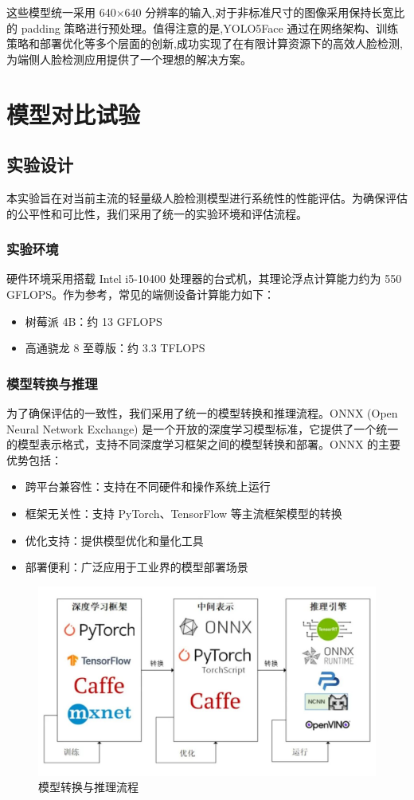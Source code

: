 \documentclass{article}
\begin{document}
这些模型统一采用 640$\times$640 分辨率的输入,对于非标准尺寸的图像采用保持长宽比的 padding 策略进行预处理。值得注意的是,YOLO5Face 通过在网络架构、训练策略和部署优化等多个层面的创新,成功实现了在有限计算资源下的高效人脸检测,为端侧人脸检测应用提供了一个理想的解决方案。

\clearpage

\section{模型对比试验}
\subsection{实验设计}

本实验旨在对当前主流的轻量级人脸检测模型进行系统性的性能评估。为确保评估的公平性和可比性，我们采用了统一的实验环境和评估流程。

\subsubsection{实验环境}
硬件环境采用搭载 Intel i5-10400 处理器的台式机，其理论浮点计算能力约为 550 GFLOPS。作为参考，常见的端侧设备计算能力如下：
\begin{itemize}
    \item 树莓派 4B：约 13 GFLOPS
    \item 高通骁龙 8 至尊版：约 3.3 TFLOPS
\end{itemize}
\subsubsection{模型转换与推理}
为了确保评估的一致性，我们采用了统一的模型转换和推理流程。ONNX (Open Neural Network Exchange) 是一个开放的深度学习模型标准，它提供了一个统一的模型表示格式，支持不同深度学习框架之间的模型转换和部署。ONNX 的主要优势包括：

\begin{itemize}
    \item 跨平台兼容性：支持在不同硬件和操作系统上运行
    \item 框架无关性：支持 PyTorch、TensorFlow 等主流框架模型的转换
    \item 优化支持：提供模型优化和量化工具
    \item 部署便利：广泛应用于工业界的模型部署场景
\end{itemize}

\begin{figure}[htbp]
    \centering
    \includegraphics[width=0.7\linewidth]{imgs/pipeline.jpg}
    \caption{模型转换与推理流程}
    \label{fig:pipeline}
\end{figure}
\end{document}

